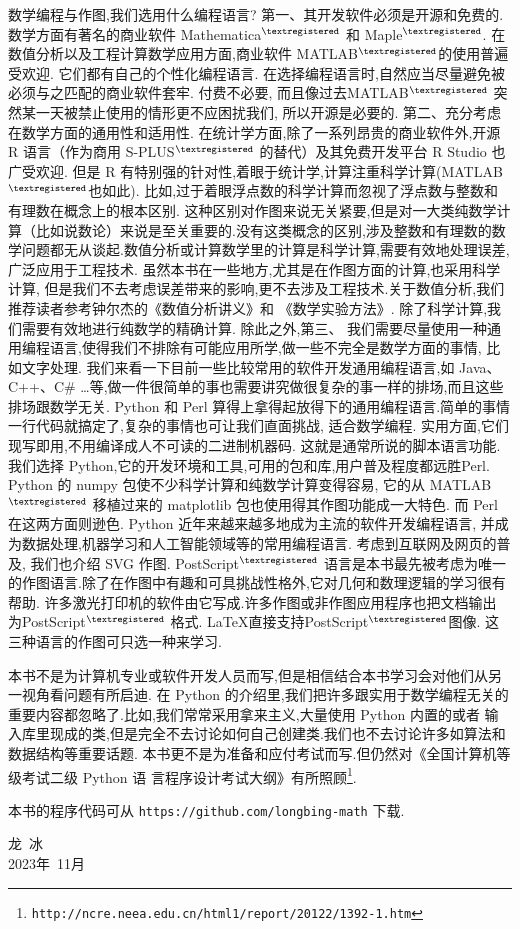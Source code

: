 数学编程与作图,我们选用什么编程语言?
第一、其开发软件必须是开源和免费的.
数学方面有著名的商业软件 Mathematica${}^{\textregistered}$ 和 Maple${}^{\textregistered}$.
在数值分析以及工程计算数学应用方面,商业软件 MATLAB${}^{\textregistered}$的使用普遍受欢迎.
它们都有自己的个性化编程语言.
在选择编程语言时,自然应当尽量避免被必须与之匹配的商业软件套牢.
付费不必要, 而且像过去MATLAB${}^{\textregistered}$ 突然某一天被禁止使用的情形更不应困扰我们, 所以开源是必要的.
第二、充分考虑在数学方面的通用性和适用性.
在统计学方面,除了一系列昂贵的商业软件外,开源 R 语言（作为商用 S-PLUS${}^{\textregistered}$ 的替代）及其免费开发平台 R Studio 也广受欢迎.
但是 R 有特别强的针对性,着眼于统计学,计算注重科学计算(MATLAB${}^{\textregistered}$也如此).
比如,过于着眼浮点数的科学计算而忽视了浮点数与整数和有理数在概念上的根本区别.
这种区别对作图来说无关紧要,但是对一大类纯数学计算（比如说数论）来说是至关重要的.没有这类概念的区别,涉及整数和有理数的数学问题都无从谈起.数值分析或计算数学里的计算是科学计算,需要有效地处理误差,广泛应用于工程技术.
虽然本书在一些地方,尤其是在作图方面的计算,也采用科学计算,
但是我们不去考虑误差带来的影响,更不去涉及工程技术.关于数值分析,我们推荐读者参考钟尔杰的《数值分析讲义》\cite{ZhongEr1}和
《数学实验方法》\cite{ZhongEr2}.
除了科学计算,我们需要有效地进行纯数学的精确计算.
除此之外,第三、
我们需要尽量使用一种通用编程语言,使得我们不排除有可能应用所学,做一些不完全是数学方面的事情, 比如文字处理.
我们来看一下目前一些比较常用的软件开发通用编程语言,如 Java、C++、C\# …等,做一件很简单的事也需要讲究做很复杂的事一样的排场,而且这些排场跟数学无关. 
Python 和 Perl 算得上拿得起放得下的通用编程语言.简单的事情一行代码就搞定了,复杂的事情也可让我们直面挑战, 适合数学编程.
实用方面,它们现写即用,不用编译成人不可读的二进制机器码.
这就是通常所说的脚本语言功能.
我们选择 Python,它的开发环境和工具,可用的包和库,用户普及程度都远胜Perl. Python 的 numpy 包使不少科学计算和纯数学计算变得容易, 它的从 MATLAB${}^{\textregistered}$ 移植过来的 matplotlib 包也使用得其作图功能成一大特色. 而 Perl 在这两方面则逊色. 
Python 近年来越来越多地成为主流的软件开发编程语言,
并成为数据处理,机器学习和人工智能领域等的常用编程语言.
考虑到互联网及网页的普及, 我们也介绍 SVG 作图. PostScript${}^{\textregistered}$ 语言是本书最先被考虑为唯一的作图语言.除了在作图中有趣和可具挑战性格外,它对几何和数理逻辑的学习很有帮助.
许多激光打印机的软件由它写成.许多作图或非作图应用程序也把文档输出
为PostScript${}^{\textregistered}$ 格式. \LaTeX 直接支持PostScript${}^{\textregistered}$图像.
这三种语言的作图可只选一种来学习.

本书不是为计算机专业或软件开发人员而写,但是相信结合本书学习会对他们从另一视角看问题有所启迪.
在 Python 的介绍里,我们把许多跟实用于数学编程无关的重要内容都忽略了.比如,我们常常采用拿来主义,大量使用 Python 内置的或者
输入库里现成的类,但是完全不去讨论如何自己创建类.我们也不去讨论许多如算法和数据结构等重要话题.
本书更不是为准备和应付考试而写.但仍然对《全国计算机等级考试二级 Python 语 言程序设计考试大纲》有所照顾\footnote{\texttt{http://ncre.neea.edu.cn/html1/report/20122/1392-1.htm}}.

本书的程序代码可从 \verb|https://github.com/longbing-math| 下载.



{\kaishu
	\begin{center}
		\hspace*{88mm}龙\,   冰\\
		\hspace*{88mm}2023年~11月
	\end{center}
}


